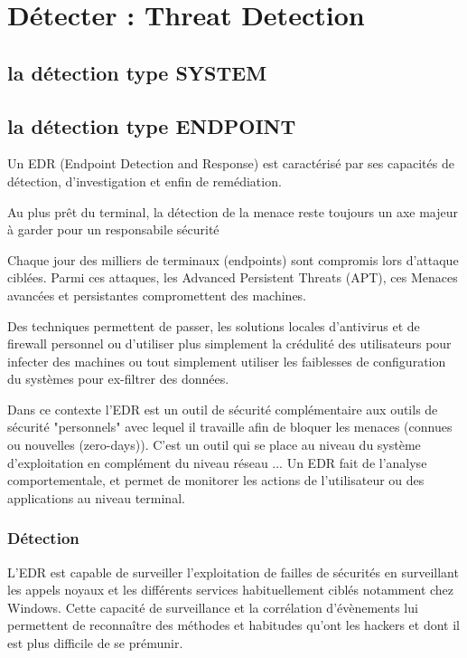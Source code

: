 
\section{Détecter : Threat Detection}

\subsection{la détection type SYSTEM}

\subsection{la détection type ENDPOINT}

Un EDR (Endpoint Detection and Response) est caractérisé par ses capacités de détection, d’investigation et enfin de remédiation.

Au plus prêt du terminal, la détection de la menace reste toujours un axe majeur à garder pour un responsabile sécurité

Chaque jour des milliers de terminaux (endpoints) sont compromis lors d'attaque ciblées. Parmi ces attaques, les Advanced Persistent Threats (APT), ces Menaces avancées et persistantes  compromettent des machines.

Des techniques permettent de passer, les solutions locales d'antivirus et de firewall personnel ou d'utiliser plus simplement la crédulité des utilisateurs pour infecter des machines ou tout simplement utiliser les faiblesses de configuration du systèmes pour ex-filtrer des données.

Dans ce contexte l’EDR est un outil de sécurité complémentaire aux outils de sécurité "personnels"  avec lequel il travaille afin de bloquer les menaces (connues ou nouvelles (zero-days)). C’est un outil qui se place au niveau du système d'exploitation en complément du niveau réseau ...  Un EDR fait de l’analyse comportementale, et permet de monitorer les actions de l'utilisateur ou des applications au niveau  terminal. 

\subsubsection{Détection}

L’EDR est capable de surveiller l’exploitation de failles de sécurités en surveillant les appels noyaux et les différents services habituellement ciblés notamment chez Windows. Cette capacité de surveillance et la corrélation d’évènements lui permettent de reconnaître des méthodes et habitudes qu’ont les hackers et dont il est plus difficile de se prémunir.

